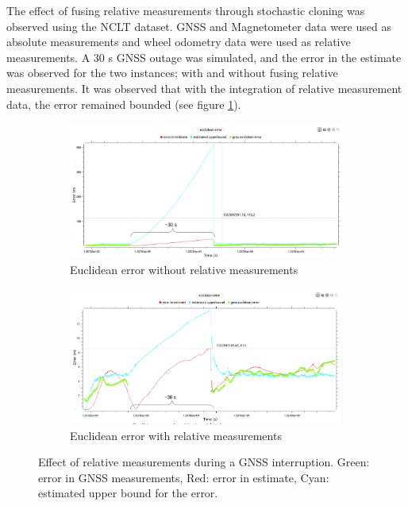 The effect of fusing relative measurements through stochastic cloning was observed using the \gls{NCLT} dataset. \gls{GNSS} and Magnetometer data were used as absolute measurements and wheel odometry data were used as relative measurements. A 30 s \gls{GNSS} outage was simulated, and the error in the estimate was observed for the two instances; with and without fusing relative measurements. It was observed that with the integration of relative measurement data, the error remained bounded (see figure \ref{fig:pa:relativeMeasurements}).
\begin{figure}[h]
	\centering
    \begin{subfigure}{\textwidth}
        \includegraphics[width=\textwidth]{figs/euclidean-error-wo-rm.png}
        \caption{Euclidean error without relative measurements}
    \end{subfigure}
    \begin{subfigure}{\textwidth}
        \includegraphics[width=\textwidth]{figs/euclidean-error-with-rm.png}
        \caption{Euclidean error with relative measurements}
    \end{subfigure}
    \caption[Effect of relative measurements]{Effect of relative measurements during a \gls{GNSS} interruption. Green: error in \gls{GNSS} measurements, Red: error in estimate, Cyan: estimated upper bound for the error.}
    \label{fig:pa:relativeMeasurements}
\end{figure}

